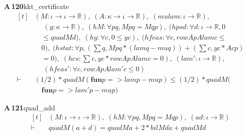 \documentclass[conference]{IEEEtran}
\theoremstyle{definition}
\newcommand{\lean}[1]{\textsf{\footnotesize #1}}
\begin{document}
\noindent\textbf{A\,120}\quad\lean{kkt\_certificate}
{\footnotesize\[ \begin{aligned}[t]
&(\mathit{M} : \iota \to \iota \to \mathbb{R} ),\; (\mathit{A} : \kappa \to \iota \to \mathbb{R} ),\; (\mathit{mu} \mathit{lam} : \iota \to \mathbb{R} ),\\
&\quad \; (\mathit{y} : \kappa \to \mathbb{R} ),\; (\mathit{hM} : \forall \mathit{p} \mathit{q}, \mathit{M} \mathit{p} \mathit{q} = \mathit{M} \mathit{q} \mathit{p}),\; (\mathit{hpsd} : \forall \mathit{d} : \iota \to \mathbb{R} , 0\\
&\quad \leq \mathit{quad} \mathit{M} \mathit{d}),\; (\mathit{hy} : \forall \mathit{c}, 0 \leq \mathit{y} \mathit{c}),\; (\mathit{hfeas} : \forall \mathit{c}, \mathit{rowAp} \mathit{A} \mathit{lam} \mathit{c} \leq\\
&\quad 0),\; (\mathit{hstat} : \forall \mathit{p}, (\textstyle\sum \mathit{q}, \mathit{M} \mathit{p} \mathit{q} * (\mathit{lam} \mathit{q} - \mathit{mu} \mathit{q})) + (\textstyle\sum \mathit{c}, \mathit{y} \mathit{c} * \mathit{A} \mathit{c} \mathit{p})\\
&\quad = 0),\; (\mathit{hcs} : \textstyle\sum \mathit{c}, \mathit{y} \mathit{c} * \mathit{rowAp} \mathit{A} \mathit{lam} \mathit{c} = 0),\; (\mathit{lam'} : \iota \to \mathbb{R} ),\\
&\quad \; (\mathit{hfeas'} : \forall \mathit{c}, \mathit{rowAp} \mathit{A} \mathit{lam'} \mathit{c} \leq 0)\\
\vdash\;&(1/2) * \mathit{quad} \mathit{M} (\mathbf{fun} \mathit{p} => \mathit{lam} \mathit{p} - \mathit{mu} \mathit{p}) \leq (1/2) * \mathit{quad} \mathit{M} (\\
&\quad \mathbf{fun} \mathit{p} => \mathit{lam'} \mathit{p} - \mathit{mu} \mathit{p})
\end{aligned} \]}

\noindent\textbf{A\,121}\quad\lean{quad\_add}
{\footnotesize\[ \begin{aligned}[t]
&(\mathit{M} : \iota \to \iota \to \mathbb{R} ),\; (\mathit{hM} : \forall \mathit{p} \mathit{q}, \mathit{M} \mathit{p} \mathit{q} = \mathit{M} \mathit{q} \mathit{p}),\; (\mathit{a} \mathit{d} : \iota \to \mathbb{R} )\\
\vdash\;&\mathit{quad} \mathit{M} (\mathit{a} + \mathit{d}) = \mathit{quad} \mathit{M} \mathit{a} + 2 * \mathit{bil} \mathit{M} \mathit{d} \mathit{a} + \mathit{quad} \mathit{M} \mathit{d}
\end{aligned} \]}
\end{document}

